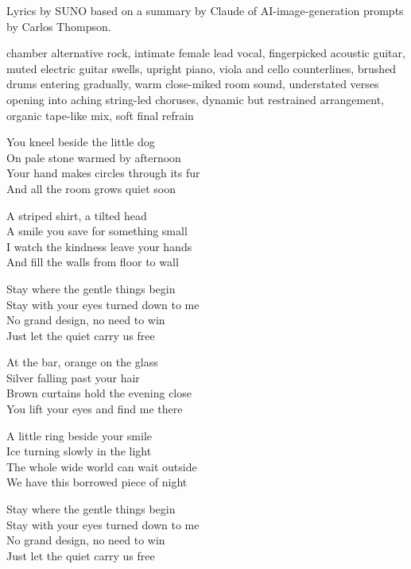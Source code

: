 
\begin{notes}
Lyrics by SUNO based on a summary by Claude of AI-image-generation prompts by Carlos Thompson.
\end{notes}
\begin{style}
chamber alternative rock, intimate female lead vocal, fingerpicked acoustic guitar, muted electric guitar swells, upright piano, viola and cello counterlines, brushed drums entering gradually, warm close-miked room sound, understated verses opening into aching string-led choruses, dynamic but restrained arrangement, organic tape-like mix, soft final refrain
\end{style}
\begin{lyrics}
You kneel beside the little dog\\
On pale stone warmed by afternoon\\
Your hand makes circles through its fur\\
And all the room grows quiet soon

A striped shirt, a tilted head\\
A smile you save for something small\\
I watch the kindness leave your hands\\
And fill the walls from floor to wall

Stay where the gentle things begin\\
Stay with your eyes turned down to me\\
No grand design, no need to win\\
Just let the quiet carry us free

At the bar, orange on the glass\\
Silver falling past your hair\\
Brown curtains hold the evening close\\
You lift your eyes and find me there

A little ring beside your smile\\
Ice turning slowly in the light\\
The whole wide world can wait outside\\
We have this borrowed piece of night

Stay where the gentle things begin\\
Stay with your eyes turned down to me\\
No grand design, no need to win\\
Just let the quiet carry us free


\end{lyrics}
